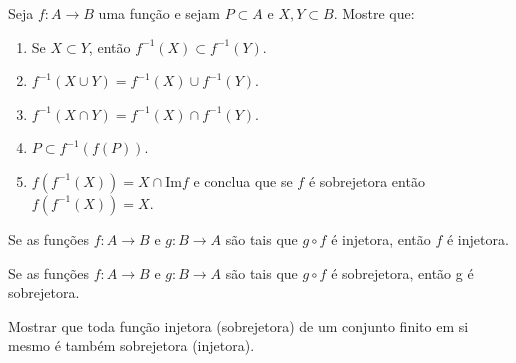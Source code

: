 \documentclass[12pt]{article}
\begin{document}
\vesp

\questao Seja $f : A \to B$ uma fun{\c c}{\~a}o e sejam $P \subset
A$ e $X, Y\subset B$. Mostre que:
\begin{enumerate}[label={\alph*})]
	\item Se $X\subset Y$, ent{\~a}o $f^{-1}(X)\subset f^{-1}(Y)$.
	\item $f^{-1}(X\cup Y)=f^{-1}(X)\cup f^{-1}(Y)$.
	\item $f^{-1}(X\cap Y)= f^{-1}(X)\cap f^{-1}(Y)$.
	\item $P\subset f^{-1}(f(P))$.
	\item $f(f^{-1}(X))= X \cap \mbox{Im}f$ e conclua que se $f$ {\'e} sobrejetora ent{\~a}o
	$f(f^{-1}(X))=X$.
\end{enumerate}

\vesp

\questao Se as fun{\c c}{\~o}es $f : A \to B$ e $g : B\to A$ s{\~a}o
tais que $g\circ f$ {\'e} injetora, ent{\~a}o $f$ {\'e} injetora.

\vesp

\questao Se as fun{\c c}{\~o}es $f : A \to B$ e $g : B\to A$ s{\~a}o
tais que $g\circ f$ {\'e} sobrejetora, ent{\~a}o g {\'e} sobrejetora.

\vesp

\questao Mostrar que toda fun{\c c}{\~a}o injetora (sobrejetora) de um conjunto finito em si mesmo {\'e} tamb{\'e}m sobrejetora (injetora).
\end{document}
